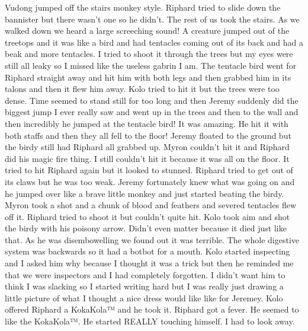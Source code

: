 Vudong jumped off the stairs monkey style. Riphard tried to slide down the bannister but there wasn’t one so he didn’t. The rest of us took the stairs. As we walked down we heard a large screeching sound! A creature jumped out of the treetops and it was like a bird and had tentacles coming out of its back and had a beak and more tentacles. I tried to shoot it through the trees but my eyes were still all leaky so I missed like the useless gabrin I am. The tentacle bird went for Riphard straight away and hit him with both legs and then grabbed him in its talons and then it flew him away. Kolo tried to hit it but the trees were too dense. Time seemed to stand still for too long and then Jeremy suddenly did the biggest jump I ever really saw and went up in the trees and then to the wall and then incredibly he jumped at the tentacle bird! It was amazing. He hit it with both staffs and then they all fell to the floor! Jeremy floated to the ground but the birdy still had Riphard all grabbed up. Myron couldn’t hit it and Riphard did his magic fire thing. I still couldn’t hit it because it was all on the floor. It tried to hit Riphard again but it looked to stunned. Riphard tried to get out of its claws but he was too weak. Jeremy fortunately knew what was going on and he jumped over like a brave little monkey and just started beating the birdy. Myron took a shot and a chunk of blood and feathers and severed tentacles flew off it. Riphard tried to shoot it but couldn’t quite hit. Kolo took aim and shot the birdy with his poisony arrow. Didn’t even matter because it died just like that. As he was disembowelling we found out it was terrible. The whole digestive system was backwards so it had a botbot for a mouth. Kolo started inspecting and I asked him why because I thought it was a trick but then he reminded me that we were inspectors and I had completely forgotten. I didn’t want him to think I was slacking so I started writing hard but I was really just drawing a little picture of what I thought a nice dress would like like for Jeremey. Kolo offered Riphard a KokaKola™ and he took it. Riphard got a fever. He seemed to like the KokaKola™. He started REALLY touching himself. I had to look away.\medskip

